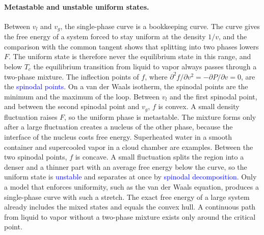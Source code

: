 \paragraph{Metastable and unstable uniform states.}
Between $v_l$ and $v_g$, the single-phase curve is a bookkeeping curve. The
curve gives the free energy of a system forced to stay uniform at the
density $1/v$, and the comparison with the common tangent shows that
splitting into two phases lowers $F$. The uniform state is therefore never
the equilibrium state in this range, and below $T_c$ the equilibrium
transition from liquid to vapor always passes through a two-phase mixture.
The inflection points of $f$, where $\partial^2 f/\partial
v^2=-\partial P/\partial v=0$, are the \textcolor{blue}{spinodal points}.
On a van der Waals isotherm, the spinodal points are the minimum and the
maximum of the loop. Between $v_l$ and the first spinodal point, and between
the second spinodal point and $v_g$, $f$ is convex. A small density
fluctuation raises $F$, so the uniform phase is metastable. The mixture
forms only after a large fluctuation creates a nucleus of the other phase,
because the interface of the nucleus costs free energy. Superheated water in
a smooth container and supercooled vapor in a cloud chamber are examples.
Between the two spinodal points, $f$ is concave. A small fluctuation splits
the region into a denser and a thinner part with an average free energy
below the curve, so the uniform state is \textcolor{blue}{unstable} and
separates at once by \textcolor{blue}{spinodal decomposition}. Only a model
that enforces uniformity, such as the van der Waals equation, produces a
single-phase curve with such a stretch. The exact free energy of a large
system already includes the mixed states and equals the convex hull. A
continuous path from liquid to vapor without a two-phase mixture exists
only around the critical point.

